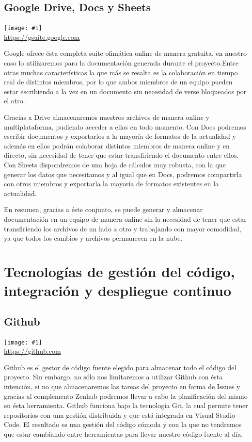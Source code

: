 \documentclass[11pt,openany]{book}
\newcommand{\logo}[2]{\medskip\begin{center}\texttt{[image: \#1]}\\\scriptsize\url{#2}\end{center}\bigskip}
\begin{document}
\subsection{Google Drive, Docs y Sheets}

\logo{logos/gsuite.png}{https://gsuite.google.com}

Google ofrece ésta completa suite ofimática online de manera gratuita, en nuestro caso lo utilizaremos para la documentación generada durante el proyecto.Entre otras muchas características la que más se resalta es la colaboración en tiempo real de distintos miembros, por lo que ambos miembros de un equipo pueden estar escribiendo a la vez en un documento sin necesidad de verse bloqueados por el otro. 

Gracias a Drive almacenaremos nuestros archivos de manera online y multiplataforma, pudiendo acceder a ellos en todo momento. Con Docs podremos escribir documentos y exportarlos a la mayoría de formatos de la actualidad y además en ellos podrán colaborar distintos miembros de manera online y en directo, sin necesidad de tener que estar transfiriendo el documento entre ellos. Con Sheets dispondremos de una hoja de cálculos muy robusta, con la que generar los datos que necesitamos y al igual que en Docs, podremos compartirla con otros miembros y exportarla la mayoría de formatos existentes en la actualidad.

En resumen, gracias a éste conjunto, se puede generar y almacenar documentación en un equipo de manera online sin la necesidad de tener que estar transfiriendo los archivos de un lado a otro y trabajando con mayor comodidad, ya que todos los cambios y archivos permanecen en la nube.
\pagebreak
\section{Tecnologías de gestión del código, integración y despliegue continuo}

\subsection{Github}

\logo{logos/github.png}{https://github.com}

Github es el gestor de código fuente elegido para almacenar todo el código del proyecto. Sin embargo, no sólo nos limitaremos a utilizar Github con ésta intención, si no que almacenaremos las tareas del proyecto en forma de Issues y gracias al complemento Zenhub podremos llevar a cabo la planificación del mismo en ésta herramienta. Github funciona bajo la tecnología Git, la cual permite tener repositorios con una gestión distribuida y que está integrada en Visual Studio Code. El resultado es una gestión del código cómoda y con la que no tendremos que estar cambiando entre herramientas para llevar nuestro código fuente al día.
\end{document}

